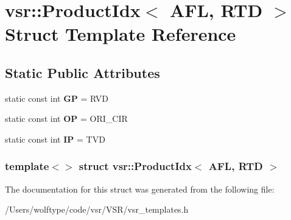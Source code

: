\hypertarget{structvsr_1_1_product_idx_3_01_a_f_l_00_01_r_t_d_01_4}{\section{vsr\-:\-:Product\-Idx$<$ A\-F\-L, R\-T\-D $>$ Struct Template Reference}
\label{structvsr_1_1_product_idx_3_01_a_f_l_00_01_r_t_d_01_4}
}
\subsection*{Static Public Attributes}
\begin{DoxyCompactItemize}
\item 
\hypertarget{structvsr_1_1_product_idx_3_01_a_f_l_00_01_r_t_d_01_4_a93245b433ab1b6dd21181613381b90ac}{static const int {\bfseries G\-P} = R\-V\-D}\label{structvsr_1_1_product_idx_3_01_a_f_l_00_01_r_t_d_01_4_a93245b433ab1b6dd21181613381b90ac}

\item 
\hypertarget{structvsr_1_1_product_idx_3_01_a_f_l_00_01_r_t_d_01_4_a08eac9e1141e32af15bcc54db24194a9}{static const int {\bfseries O\-P} = O\-R\-I\-\_\-\-C\-I\-R}\label{structvsr_1_1_product_idx_3_01_a_f_l_00_01_r_t_d_01_4_a08eac9e1141e32af15bcc54db24194a9}

\item 
\hypertarget{structvsr_1_1_product_idx_3_01_a_f_l_00_01_r_t_d_01_4_addd1db8d17d496adc6f3cc3807d0b85d}{static const int {\bfseries I\-P} = T\-V\-D}\label{structvsr_1_1_product_idx_3_01_a_f_l_00_01_r_t_d_01_4_addd1db8d17d496adc6f3cc3807d0b85d}

\end{DoxyCompactItemize}
\subsubsection*{template$<$$>$ struct vsr\-::\-Product\-Idx$<$ A\-F\-L, R\-T\-D $>$}



The documentation for this struct was generated from the following file\-:\begin{DoxyCompactItemize}
\item 
/\-Users/wolftype/code/vsr/\-V\-S\-R/vsr\-\_\-templates.\-h\end{DoxyCompactItemize}
